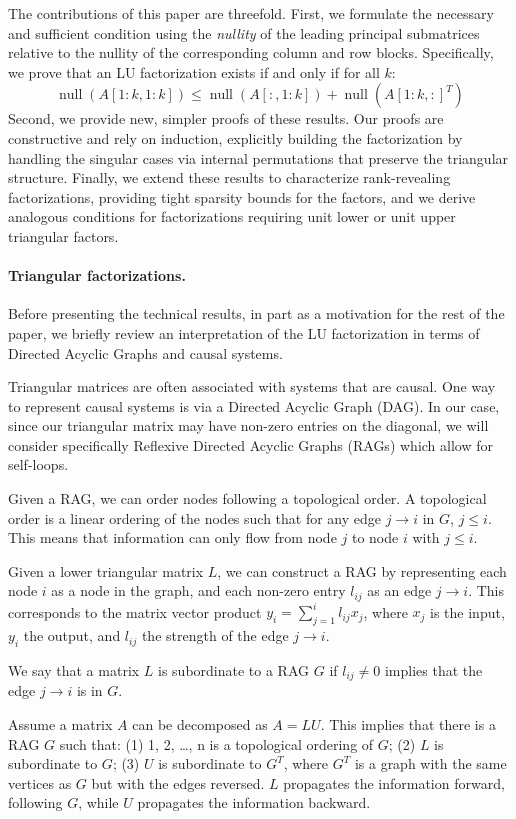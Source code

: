 \documentclass{article}
\DeclareMathOperator{\nl}{null}
\begin{document}
The contributions of this paper are threefold. First, we formulate the necessary and sufficient condition using the \emph{nullity} of the leading principal submatrices relative to the nullity of the corresponding column and row blocks. Specifically, we prove that an LU factorization exists if and only if for all $k$:
\[
    \nl(A[1:k,1:k]) \le \nl(A[:,1:k]) + \nl({A[1:k,:]}^T)
\]
Second, we provide new, simpler proofs of these results. Our proofs are constructive and rely on induction, explicitly building the factorization by handling the singular cases via internal permutations that preserve the triangular structure. Finally, we extend these results to characterize rank-revealing factorizations, providing tight sparsity bounds for the factors, and we derive analogous conditions for factorizations requiring unit lower or unit upper triangular factors.

\paragraph{Triangular factorizations.} Before presenting the technical results, in part as a motivation for the rest of the paper, we briefly review an interpretation of the LU factorization in terms of Directed Acyclic Graphs and causal systems.

Triangular matrices are often associated with systems that are causal. One way to represent causal systems is via a Directed Acyclic Graph (DAG). In our case, since our triangular matrix may have non-zero entries on the diagonal, we will consider specifically Reflexive Directed Acyclic Graphs (RAGs) which allow for self-loops.

Given a RAG, we can order nodes following a topological order. A topological order is a linear ordering of the nodes such that for any edge $j \to i$ in $G$, $j \le i$. This means that information can only flow from node $j$ to node $i$ with $j \le i$.

Given a lower triangular matrix $L$, we can construct a RAG by representing each node $i$ as a node in the graph, and each non-zero entry $l_{ij}$ as an edge $j \to i$. This corresponds to the matrix vector product $y_i = \sum_{j=1}^i l_{ij} x_j$, where $x_j$ is the input, $y_i$ the output, and $l_{ij}$ the strength of the edge $j \to i$.

We say that a matrix $L$ is subordinate to a RAG $G$ if $l_{ij} \neq 0$ implies that the edge $j \to i$ is in $G$.

Assume a matrix $A$ can be decomposed as $A = LU$. This implies that there is a RAG $G$ such that: (1) 1, 2, \dots, n is a topological ordering of $G$; (2) $L$ is subordinate to $G$; (3) $U$ is subordinate to $G^T$, where $G^T$ is a graph with the same vertices as $G$ but with the edges reversed. $L$ propagates the information forward, following $G$, while $U$ propagates the information backward.
\end{document}
